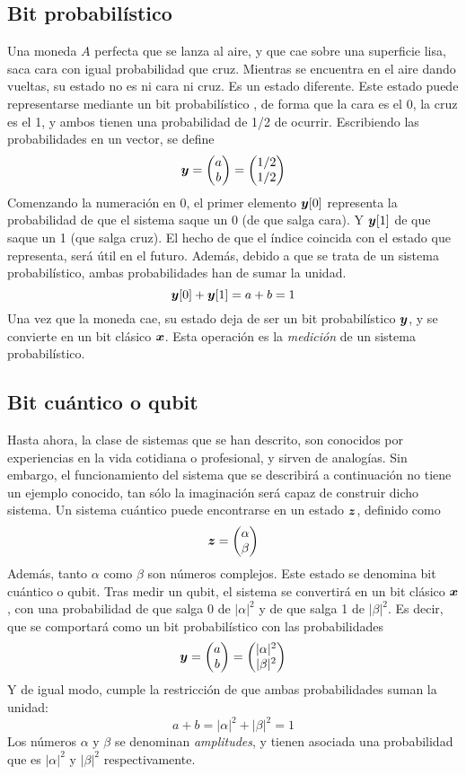 \subsection{Bit probabilístico}

Una moneda $A$ perfecta que se lanza al aire, y que cae sobre una superficie 
lisa, saca cara con igual probabilidad que cruz. Mientras se encuentra en el 
aire dando vueltas, su estado no es ni cara ni cruz. Es un estado diferente.  
Este estado puede representarse mediante un bit probabilístico \cite{watrous}, 
de forma que la cara es el 0, la cruz es el 1, y ambos tienen una probabilidad 
de 1/2 de ocurrir.  Escribiendo las probabilidades en un vector, se define
%
$$ \boldsymbol{y} = \begin{pmatrix} a \\ b \end{pmatrix} = \begin{pmatrix} 1/2 \\ 1/2 \end{pmatrix} $$
%
Comenzando la numeración en 0, el primer elemento $\boldsymbol{y} [0]$ representa la 
probabilidad de que el sistema saque un 0 (de que salga cara). Y $\boldsymbol{y} [1]$ de 
que saque un 1 (que salga cruz). El hecho de que el índice coincida con el 
estado que representa, será útil en el futuro.
%
Además, debido a que se trata de un sistema probabilístico, ambas probabilidades 
han de sumar la unidad.
%
$$ \boldsymbol{y} [0] + \boldsymbol{y} [1] = a + b = 1 $$
%
Una vez que la moneda cae, su estado deja de ser un bit probabilístico $\boldsymbol{y}$, y 
se convierte en un bit clásico $\boldsymbol{x}$. Esta operación es la \textit{medición} de 
un sistema probabilístico.

\subsection{Bit cuántico o qubit}

Hasta ahora, la clase de sistemas que se han descrito, son conocidos por 
experiencias en la vida cotidiana o profesional, y sirven de analogías. Sin 
embargo, el funcionamiento del sistema que se describirá a continuación no tiene 
un ejemplo conocido, tan sólo la imaginación será capaz de construir dicho 
sistema.
%
Un sistema cuántico puede encontrarse en un estado $\boldsymbol{z}$, definido como
%
$$ \boldsymbol{z} = \begin{pmatrix} \alpha \\ \beta \end{pmatrix}$$
%
Además, tanto $\alpha$ como $\beta$ son números complejos. Este estado se 
denomina bit cuántico o qubit.
%
Tras medir un qubit, el sistema se convertirá en un bit clásico $\boldsymbol{x}$, con una 
probabilidad de que salga 0 de $|\alpha|^2$ y de que salga 1 de $|\beta|^2$.
Es decir, que se comportará como un bit probabilístico con las probabilidades
%
$$ \boldsymbol{y} = \begin{pmatrix} a \\ b \end{pmatrix} = \begin{pmatrix} |\alpha|^2 \\ |\beta|^2 \end{pmatrix}$$
%
Y de igual modo, cumple la restricción de que ambas probabilidades suman la 
unidad:
%
$$ a + b = |\alpha|^2 + |\beta|^2 = 1 $$
%
Los números $\alpha$ y $\beta$ se denominan \textit{amplitudes}, y tienen 
asociada una probabilidad que es $|\alpha|^2$ y $|\beta|^2$ respectivamente.

